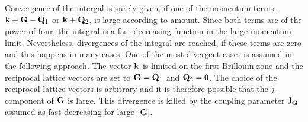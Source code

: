 %
%
%
%
Convergence of the intergal is surely given, if one of the momentum terms, $\vb{k}+\vb{G}-\vb{Q}_{1}$ or $\vb{k} + \vb{Q}_{2}$, is large according to amount.
Since both terms are of the power of four, the integral is a fast decreasing function in the large momentum limit.
Nevertheless, divergences of the integral are reached, if these terms are zero and this happens in many cases.
One of the most divergent cases is assumed in the following approach.
The vector $\vb{k}$ is limited on the first Brillouin zone and the reciprocal lattice vectors are set to $\vb{G} = \vb{Q}_{1}$ and $\vb{Q}_{2} = 0$.
The choice of the reciprocal lattice vectors is arbitrary and it is therefore possible that the $j$-component of $\vb{G}$ is large.
This divergence is killed by the coupling parameter $\mathrm{J}_{\vb{G}}$ assumed as fast decreasing for large $|\vb{G}|$.

